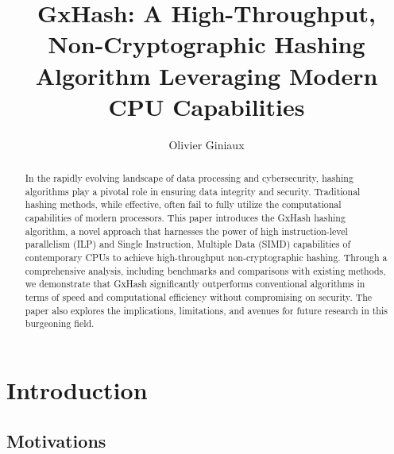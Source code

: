 \documentclass[10pt]{article}
\title{GxHash: A High-Throughput, Non-Cryptographic Hashing Algorithm Leveraging Modern CPU Capabilities}
\author{Olivier Giniaux}
\date{}
\begin{document}
\maketitle

\begin{abstract}

In the rapidly evolving landscape of data processing and cybersecurity, hashing algorithms play a pivotal role in ensuring data integrity and security.
Traditional hashing methods, while effective, often fail to fully utilize the computational capabilities of modern processors.
This paper introduces the GxHash hashing algorithm, a novel approach that harnesses the power of high instruction-level parallelism (ILP) and Single
Instruction, Multiple Data (SIMD) capabilities of contemporary CPUs to achieve high-throughput non-cryptographic hashing. Through a comprehensive
analysis, including benchmarks and comparisons with existing methods, we demonstrate that GxHash significantly outperforms conventional algorithms
in terms of speed and computational efficiency without compromising on security. The paper also explores the implications, limitations, and avenues
for future research in this burgeoning field.

\end{abstract}

\begin{multicols}{2}
\tableofcontents
\end{multicols}

\clearpage
\section{Introduction}

\subsection{Motivations}
\end{document}
